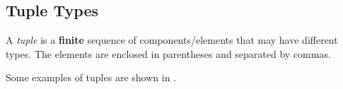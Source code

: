 \subsection{Tuple Types}\label{subsec:Tuple_Types}
\begin{definition}[Tuple]\label{def:Tuple}
  A \emph{tuple} is a \textbf{finite} sequence of components/elements that may have different types.
  The elements are enclosed in parentheses and separated by commas.

  Some examples of tuples are shown in .
\end{definition}


